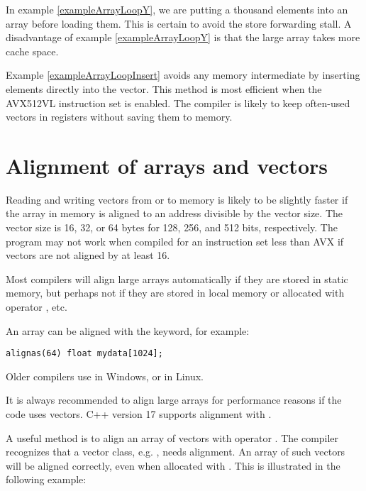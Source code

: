 \documentclass[vcl_manual.tex]{subfiles}
\begin{document}
In example \ref{exampleArrayLoopY}, we are putting a thousand elements into an array before loading them. This is certain to avoid the store forwarding stall. A disadvantage of example \ref{exampleArrayLoopY} is that the large array takes more cache space.

Example \ref{exampleArrayLoopInsert} avoids any memory intermediate by inserting elements directly into the vector. This method is most efficient when the AVX512VL instruction set is enabled. The compiler is likely to keep often-used vectors in registers without saving them to memory.


\section{Alignment of arrays and vectors}\label{Alignment}

Reading and writing vectors from or to memory is likely to be slightly faster if the array in memory is aligned to an address divisible by the vector size. The vector size is 16, 32, or 64 bytes for 128, 256, and 512 bits, respectively. The program may not work when compiled for an instruction set less than AVX if vectors are not aligned by at least 16.

Most compilers will align large arrays automatically if they are stored in static memory, but perhaps not if they are stored in local memory or allocated with operator , etc.

An array can be aligned with the  keyword, for example:

\begin{lstlisting}[frame=none]
alignas(64) float mydata[1024];
\end{lstlisting}

Older compilers use  in Windows, or 
  in Linux.


It is always recommended to align large arrays for performance reasons if the code uses vectors. C++ version 17 supports alignment with . 

A useful method is to align an array of vectors with operator . The compiler recognizes that a vector class, e.g. , needs alignment. An array of such vectors will be aligned correctly, even when allocated with . This is illustrated in the following example:
\end{document}
